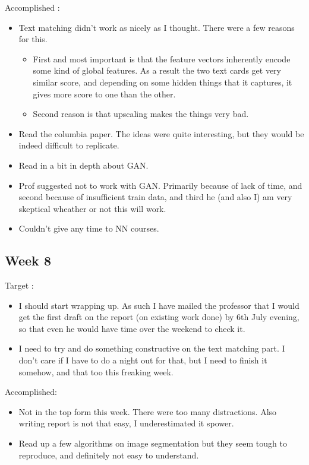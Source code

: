 \documentclass{article}
\begin{document}
Accomplished :
\begin{itemize}
\item Text matching didn't work as nicely as I thought. There were a few reasons for this.
  \begin{itemize}
  \item First and most important is that the feature vectors inherently encode some kind of global features. As a result the two text cards get very similar score, and depending on some hidden things that it captures, it gives more score to one than the other.
  \item Second reason is that upscaling makes the things very bad.
  \end{itemize}
\item Read the columbia paper. The ideas were quite interesting, but they would be indeed difficult to replicate.
\item Read in a bit in depth about GAN.
\item Prof suggested not to work with GAN. Primarily because of lack of time, and second because of insufficient train data, and third he (and also I) am very skeptical wheather or not this will work.
\item Couldn't give any time to NN courses.
\end{itemize}

\subsection{Week 8}
Target :
\begin{itemize}
\item I should start wrapping up. As such I have mailed the professor that I would get the first draft on the report (on existing work done) by 6th July evening, so that even he would have time over the weekend to check it.
\item I need to try and do something constructive on the text matching part. I don't care if I have to do a night out for that, but I need to finish it somehow, and that too this freaking week.
\end{itemize}

Accomplished:
\begin{itemize}
\item Not in the top form this week. There were too many distractions. Also writing report is not that easy, I underestimated it spower.
\item Read up a few algorithms on image segmentation but they seem tough to reproduce, and definitely not easy to understand.
\end{itemize}
\end{document}
